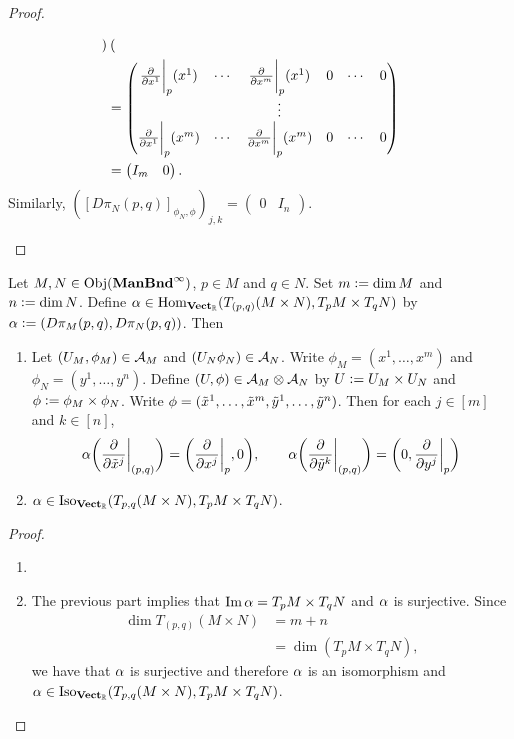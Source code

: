 \documentclass{book}
\begin{document}
\begin{proof}
\begin{enumerate}
\begin{align*}
\begin{pmatrix}
				\end{pmatrix} \\
				& = 
				\begin{pmatrix}
					\frac{\partial}{\partial x^1} \bigg|_p (x^1) & \cdots &  \frac{\partial}{\partial x^m} \bigg|_p (x^1) & 0  & \cdots & 0 \\
					&& \vdots \\
					\frac{\partial}{\partial x^1} \bigg|_p (x^m) & \cdots &  \frac{\partial}{\partial x^m} \bigg|_p (x^m) & 0  & \cdots & 0 \\ 
				\end{pmatrix} \\
				& = 
				\begin{pmatrix}
					I_m & 0 
				\end{pmatrix}. 
			\end{align*}
			Similarly, $([D \pi_N (p,q)]_{\phi_N, \phi})_{j,k} = 
			\begin{pmatrix}
				0 & I_n 
			\end{pmatrix}$.
		\end{enumerate}
	\end{proof}

	\begin{ex} 
			Let $M,N \in \operatorname{Obj}(\operatorname*{\text{\textbf{ManBnd}}^{\infty}})$, $p \in M$ and $q \in N$. Set $m \vcentcolon= \dim M$ and $n \vcentcolon= \dim N$. Define $\alpha \in \operatorname{Hom}_{\operatorname*{\text{\textbf{Vect}}_{\mathbb{R}}}}(T_{(p, q)} (M \times N), T_p M \times T_q N)$ by $\alpha \vcentcolon= (D \pi_{M}(p, q), D \pi_N(p,q))$. Then
			\begin{enumerate}
				\item  Let $(U_M, \phi_M) \in \mathcal{A}_M$ and $(U_N\phi_N) \in \mathcal{A}_N$. Write $\phi_M = (x^1, \ldots, x^m)$ and $\phi_N = (y^1, \ldots, y^n)$. Define $(U, \phi) \in \mathcal{A}_M \otimes \mathcal{A}_N$ by $U \vcentcolon= U_M \times U_N$ and $\phi \vcentcolon= \phi_M \times \phi_N$. Write $\phi = (\tilde{x}^1, \ldots, \tilde{x}^m, \tilde{y}^1, \ldots, \tilde{y}^n)$. Then for each $j \in [m]$ and $k \in [n]$, 
				$$ \alpha \bigg( \frac{\partial}{\partial \tilde{x}^j} \bigg|_{(p,q)} \bigg) = \bigg( \frac{\partial}{\partial x^j} \bigg|_p , 0\bigg), \quad  \quad \alpha \bigg( \frac{\partial}{\partial \tilde{y}^k} \bigg|_{(p,q)} \bigg) = \bigg( 0, \frac{\partial}{\partial y^j} \bigg|_p \bigg)$$
				\item $\alpha \in \operatorname{Iso}_{\operatorname*{\text{\textbf{Vect}}_{\mathbb{R}}}}(T_{p, q} (M \times N), T_p M \times  T_q N)$.
			\end{enumerate}		
	\end{ex}

	\begin{proof}\
		\begin{enumerate}
			\item {}
			\item The previous part implies that $\text{Im} \, \alpha = T_pM \times  T_qN$ and $\alpha$ is surjective. Since 
			\begin{align*}
				\dim T_{(p, q)} (M \times N) 
				& = m + n \\
				& = \dim( T_pM \times  T_qN),
			\end{align*}
			we have that $\alpha$ is surjective and therefore $\alpha$ is an isomorphism and $\alpha \in \operatorname{Iso}_{\operatorname*{\text{\textbf{Vect}}_{\mathbb{R}}}}(T_{p, q} (M \times N), T_p M \times  T_q N)$. 
		\end{enumerate}
	\end{proof}
\end{document}
